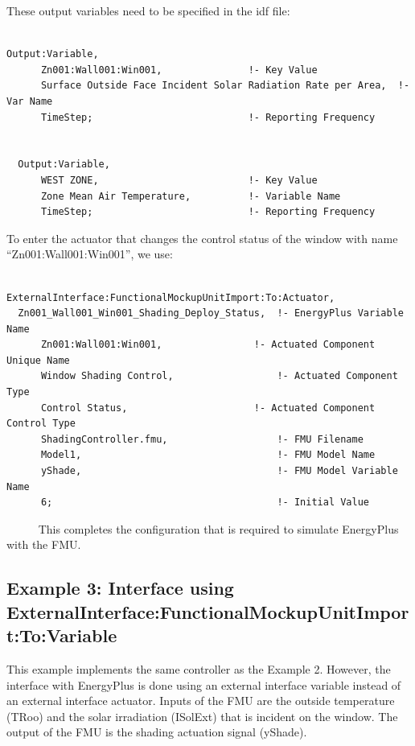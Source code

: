 These output variables need to be specified in the idf file:

\begin{lstlisting}

Output:Variable,
      Zn001:Wall001:Win001,               !- Key Value
      Surface Outside Face Incident Solar Radiation Rate per Area,  !- Var Name
      TimeStep;                           !- Reporting Frequency


  Output:Variable,
      WEST ZONE,                          !- Key Value
      Zone Mean Air Temperature,          !- Variable Name
      TimeStep;                           !- Reporting Frequency
\end{lstlisting}

To enter the actuator that changes the control status of the window with name ``Zn001:Wall001:Win001'', we use:

\begin{lstlisting}

ExternalInterface:FunctionalMockupUnitImport:To:Actuator,
  Zn001_Wall001_Win001_Shading_Deploy_Status,  !- EnergyPlus Variable Name
      Zn001:Wall001:Win001,                !- Actuated Component Unique Name
      Window Shading Control,                  !- Actuated Component Type
      Control Status,                      !- Actuated Component Control Type
      ShadingController.fmu,                   !- FMU Filename
      Model1,                                  !- FMU Model Name
      yShade,                                  !- FMU Model Variable Name
      6;                                       !- Initial Value
\end{lstlisting}

~~~~~ This completes the configuration that is required to simulate EnergyPlus with the FMU.

\subsection{Example 3: Interface using ExternalInterface:FunctionalMockupUnitImport:To:Variable}\label{example-3-interface-using-externalinterfacefunctionalmockupunitimporttovariable}

This example implements the same controller as the Example 2. However, the interface with EnergyPlus is done using an external interface variable instead of an external interface actuator. Inputs of the FMU are the outside temperature (TRoo) and the solar irradiation (ISolExt) that is incident on the window. The output of the FMU is the shading actuation signal (yShade).

